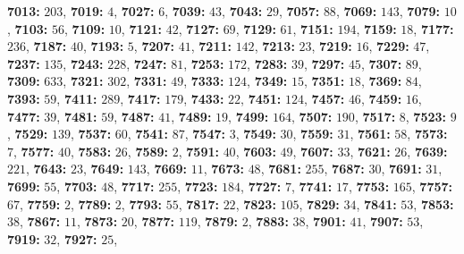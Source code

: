 \textsf{\bfseries 7013:} $203$, \textsf{\bfseries 7019:} $4$, \textsf{\bfseries 7027:} $6$, \textsf{\bfseries 7039:} $43$, \textsf{\bfseries 7043:} $29$, \textsf{\bfseries 7057:} $88$, \textsf{\bfseries 7069:} $143$, \textsf{\bfseries 7079:} $10$, \textsf{\bfseries 7103:} $56$, \textsf{\bfseries 7109:} $10$, \textsf{\bfseries 7121:} $42$, \textsf{\bfseries 7127:} $69$, \textsf{\bfseries 7129:} $61$, \textsf{\bfseries 7151:} $194$, \textsf{\bfseries 7159:} $18$, \textsf{\bfseries 7177:} $236$, \textsf{\bfseries 7187:} $40$, \textsf{\bfseries 7193:} $5$, \textsf{\bfseries 7207:} $41$, \textsf{\bfseries 7211:} $142$, \textsf{\bfseries 7213:} $23$, \textsf{\bfseries 7219:} $16$, \textsf{\bfseries 7229:} $47$, \textsf{\bfseries 7237:} $135$, \textsf{\bfseries 7243:} $228$, \textsf{\bfseries 7247:} $81$, \textsf{\bfseries 7253:} $172$, \textsf{\bfseries 7283:} $39$, \textsf{\bfseries 7297:} $45$, \textsf{\bfseries 7307:} $89$, \textsf{\bfseries 7309:} $633$, \textsf{\bfseries 7321:} $302$, \textsf{\bfseries 7331:} $49$, \textsf{\bfseries 7333:} $124$, \textsf{\bfseries 7349:} $15$, \textsf{\bfseries 7351:} $18$, \textsf{\bfseries 7369:} $84$, \textsf{\bfseries 7393:} $59$, \textsf{\bfseries 7411:} $289$, \textsf{\bfseries 7417:} $179$, \textsf{\bfseries 7433:} $22$, \textsf{\bfseries 7451:} $124$, \textsf{\bfseries 7457:} $46$, \textsf{\bfseries 7459:} $16$, \textsf{\bfseries 7477:} $39$, \textsf{\bfseries 7481:} $59$, \textsf{\bfseries 7487:} $41$, \textsf{\bfseries 7489:} $19$, \textsf{\bfseries 7499:} $164$, \textsf{\bfseries 7507:} $190$, \textsf{\bfseries 7517:} $8$, \textsf{\bfseries 7523:} $9$, \textsf{\bfseries 7529:} $139$, \textsf{\bfseries 7537:} $60$, \textsf{\bfseries 7541:} $87$, \textsf{\bfseries 7547:} $3$, \textsf{\bfseries 7549:} $30$, \textsf{\bfseries 7559:} $31$, \textsf{\bfseries 7561:} $58$, \textsf{\bfseries 7573:} $7$, \textsf{\bfseries 7577:} $40$, \textsf{\bfseries 7583:} $26$, \textsf{\bfseries 7589:} $2$, \textsf{\bfseries 7591:} $40$, \textsf{\bfseries 7603:} $49$, \textsf{\bfseries 7607:} $33$, \textsf{\bfseries 7621:} $26$, \textsf{\bfseries 7639:} $221$, \textsf{\bfseries 7643:} $23$, \textsf{\bfseries 7649:} $143$, \textsf{\bfseries 7669:} $11$, \textsf{\bfseries 7673:} $48$, \textsf{\bfseries 7681:} $255$, \textsf{\bfseries 7687:} $30$, \textsf{\bfseries 7691:} $31$, \textsf{\bfseries 7699:} $55$, \textsf{\bfseries 7703:} $48$, \textsf{\bfseries 7717:} $255$, \textsf{\bfseries 7723:} $184$, \textsf{\bfseries 7727:} $7$, \textsf{\bfseries 7741:} $17$, \textsf{\bfseries 7753:} $165$, \textsf{\bfseries 7757:} $67$, \textsf{\bfseries 7759:} $2$, \textsf{\bfseries 7789:} $2$, \textsf{\bfseries 7793:} $55$, \textsf{\bfseries 7817:} $22$, \textsf{\bfseries 7823:} $105$, \textsf{\bfseries 7829:} $34$, \textsf{\bfseries 7841:} $53$, \textsf{\bfseries 7853:} $38$, \textsf{\bfseries 7867:} $11$, \textsf{\bfseries 7873:} $20$, \textsf{\bfseries 7877:} $119$, \textsf{\bfseries 7879:} $2$, \textsf{\bfseries 7883:} $38$, \textsf{\bfseries 7901:} $41$, \textsf{\bfseries 7907:} $53$, \textsf{\bfseries 7919:} $32$, \textsf{\bfseries 7927:} $25$, 
